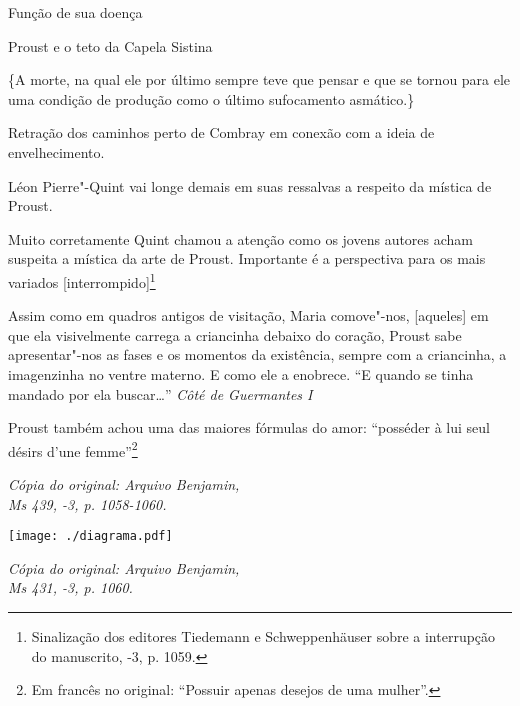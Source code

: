 \noindent{}Função de sua doença

\noindent{}Proust e o teto da Capela Sistina

\medskip

\{A morte, na qual ele por último sempre teve que pensar e que se tornou
para ele uma condição de produção como o último sufocamento asmático.\}

Retração dos caminhos perto de Combray em conexão com a ideia de
envelhecimento.

Léon Pierre"-Quint vai longe demais em suas ressalvas a respeito da
mística de Proust.

Muito corretamente Quint chamou a atenção como os jovens autores acham
suspeita a mística da arte de Proust. Importante é a perspectiva para os
mais variados {[}interrompido{]}\footnote{Sinalização dos editores
  Tiedemann e Schweppenhäuser sobre a interrupção do manuscrito,
  -3, p. 1059. \versal{[N. T.]}}

Assim como em quadros antigos de visitação, Maria comove"-nos,
{[}aqueles{]} em que ela visivelmente carrega a criancinha debaixo do
coração, Proust sabe apresentar"-nos as fases e os momentos da
existência, sempre com a criancinha, a imagenzinha no ventre materno. E
como ele a enobrece. ``E quando se tinha mandado por ela buscar\ldots{}''
\emph{Côté de Guermantes I}

Proust também achou uma das maiores fórmulas do amor: ``posséder à lui
seul désirs d'une femme''\footnote{Em francês no original:
  ``Possuir apenas desejos de uma mulher''. \versal{[N. T.]}}

\begin{flushright}
\emph{\footnotesize{Cópia do original: Arquivo Benjamin,\\ Ms 439, -3, p. 1058-1060.}}
\end{flushright}

\begin{flushleft}
\hspace*{-1.7cm}\texttt{[image: ./diagrama.pdf]}
\end{flushleft}

\begin{flushright}
\emph{\footnotesize{Cópia do original: Arquivo Benjamin,\\ Ms 431, -3, p. 1060.}}
\end{flushright}

